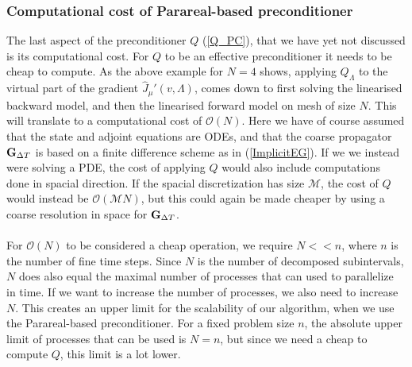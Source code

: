 \subsubsection{Computational cost of Parareal-based preconditioner}
The last aspect of the preconditioner $Q$ (\ref{Q_PC}), that we have yet not discussed is its computational cost. For $Q$ to be an effective preconditioner it needs to be cheap to compute. As the above example for $N=4$ shows, applying $Q_{\Lambda}$ to the virtual part of the gradient $\hat J_{\mu}'(v,\Lambda)$, comes down to first solving the linearised backward model, and then the linearised forward model on mesh of size $N$. This will translate to a computational cost of $\mathcal{O}(N)$. Here we have of course assumed that the state and adjoint equations are ODEs, and that the coarse propagator $\bold G_{\Delta T}$ is based on a finite difference scheme as in (\ref{ImplicitEG}). If we we instead were solving a PDE, the cost of applying $Q$ would also include computations done in spacial direction. If the spacial discretization has size $\mathcal{M}$, the cost of $Q$ would instead be $\mathcal{O}(\mathcal{M}N)$, but this could again be made cheaper by using a coarse resolution in space for $\bold G_{\Delta T}$. 
\\
\\
For $\mathcal{O}(N)$ to be considered a cheap operation, we require $N<<n$, where $n$ is the number of fine time steps. Since $N$ is the number of decomposed subintervals, $N$ does also equal the maximal number of processes that can used to parallelize in time. If we want to increase the number of processes, we also need to increase $N$. This creates an upper limit for the scalability of our algorithm, when we use the Parareal-based preconditioner. For a fixed problem size $n$, the absolute upper limit of processes that can be used is $N=n$, but since we need a cheap to compute $Q$, this limit is a lot lower.  
